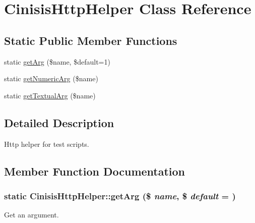 \hypertarget{classCinisisHttpHelper}{
\section{CinisisHttpHelper Class Reference}
\label{classCinisisHttpHelper}
}
\subsection*{Static Public Member Functions}
\begin{DoxyCompactItemize}
\item 
static \hyperlink{classCinisisHttpHelper_a308f89e9f2235ae3dd1ccfb03aef4c3c}{getArg} (\$name, \$default=1)
\item 
static \hyperlink{classCinisisHttpHelper_a6490e2a456242fae618802f4dac2e553}{getNumericArg} (\$name)
\item 
static \hyperlink{classCinisisHttpHelper_a6bf24e1b8e1d90e59b52813bb2a65378}{getTextualArg} (\$name)
\end{DoxyCompactItemize}


\subsection{Detailed Description}
Http helper for test scripts. 

\subsection{Member Function Documentation}
\hypertarget{classCinisisHttpHelper_a308f89e9f2235ae3dd1ccfb03aef4c3c}{
\subsubsection[{getArg}]{\setlength{\rightskip}{0pt plus 5cm}static CinisisHttpHelper::getArg (\$ {\em name}, \/  \$ {\em default} = {})}}
\label{classCinisisHttpHelper_a308f89e9f2235ae3dd1ccfb03aef4c3c}
Get an argument.


